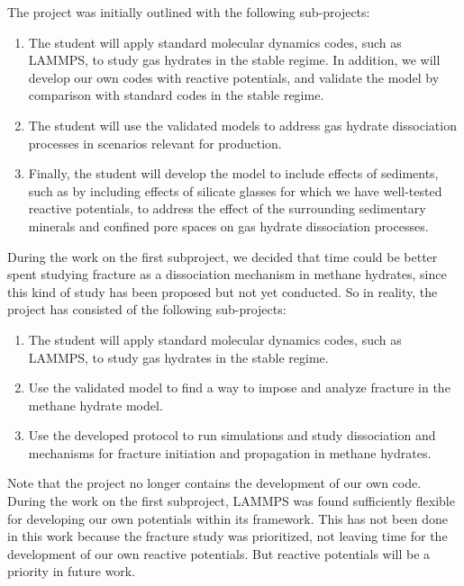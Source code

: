 The project was initially outlined with the following sub-projects:
\begin{enumerate}
\item {}
The student will apply standard molecular dynamics codes, such as LAMMPS,
to study gas hydrates in the stable regime. In addition, we will develop our
own codes with reactive potentials, and validate the model by comparison with
standard codes in the stable regime.
\item {}
The student will use the validated models to address gas hydrate dissociation
processes in scenarios relevant for production.
\item {}
Finally, the student will develop the model to include effects of sediments, such
as by including effects of silicate glasses for which we have well-tested reactive
potentials, to address the effect of the surrounding sedimentary minerals and
confined pore spaces on gas hydrate dissociation processes.
\end{enumerate}

During the work on the first subproject, we decided that time could be better spent studying fracture as a dissociation mechanism in methane hydrates, since this kind of study has been proposed but not yet conducted. So in reality, the project has consisted of the following sub-projects:

\begin{enumerate}
\item {}
The student will apply standard molecular dynamics codes, such as LAMMPS,
to study gas hydrates in the stable regime.
\item {}
Use the validated model to find a way to impose and analyze fracture in the methane hydrate model. 
\item {}
Use the developed protocol to run simulations and study dissociation and mechanisms for fracture initiation and propagation in methane hydrates.
\end{enumerate}

Note that the project no longer contains the development of our own code. During the work on the first subproject, LAMMPS was found sufficiently flexible for developing our own potentials within its framework. This has not been done in this work because the fracture study was prioritized, not leaving time for the development of our own reactive potentials. But reactive potentials will be a priority in future work.

